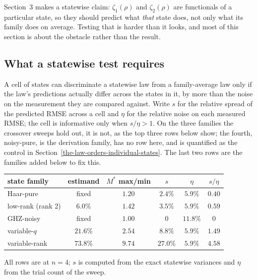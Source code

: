 \documentclass[a4paper,superscriptaddress,nofootinbib,onecolumn,nopdfoutputerror]{quantumarticle}
\begin{document}
Section~3 makes a statewise claim: \(\zeta_1(\rho)\) and \(\zeta_2(\rho)\) are functionals of a
particular state, so they should predict what \emph{that} state does, not only what its family
does on average. Testing that is harder than it looks, and most of this section is about the
obstacle rather than the result.

\hypertarget{what-a-statewise-test-requires}{%
\subsection{What a statewise test requires}\label{what-a-statewise-test-requires}}

A cell of states can discriminate a statewise law from a family-average law only if the law's
predictions actually differ across the states in it, by more than the noise on the measurement
they are compared against. Write \(s\) for the relative spread of the predicted RMSE across a
cell and \(\eta\) for the relative noise on each measured RMSE; the cell is informative only when
\(s/\eta > 1\). On the three families the crossover sweeps hold out, it is not, as the
top three rows below show; the fourth, noisy-pure, is the derivation family, has no row here, and
is quantified as the control in Section~\ref{the-law-orders-individual-states}. The last two rows
are the families added below to fix this.

\begin{center}
\begin{tabular}{lccccc}
\hline
state family & estimand & \(M^*\) max/min & \(s\) & \(\eta\) & \(s/\eta\) \\
\hline
Haar-pure          & fixed   & \(1.20\) & \(2.4\%\)  & \(5.9\%\)  & \(0.40\) \\
low-rank (rank 2)  & \(6.0\%\) & \(1.42\) & \(3.5\%\)  & \(5.9\%\)  & \(0.59\) \\
GHZ-noisy          & fixed   & \(1.00\) & \(0\)      & \(11.8\%\) & \(0\) \\
\hline
variable-\(q\)     & \(21.6\%\) & \(2.54\) & \(8.8\%\)  & \(5.9\%\)  & \(1.49\) \\
variable-rank      & \(73.8\%\) & \(9.74\) & \(27.0\%\) & \(5.9\%\)  & \(4.58\) \\
\hline
\end{tabular}
\end{center}

\noindent
All rows are at \(n = 4\); \(s\) is computed from the exact statewise variances and \(\eta\)
from the trial count of the sweep.
\end{document}
